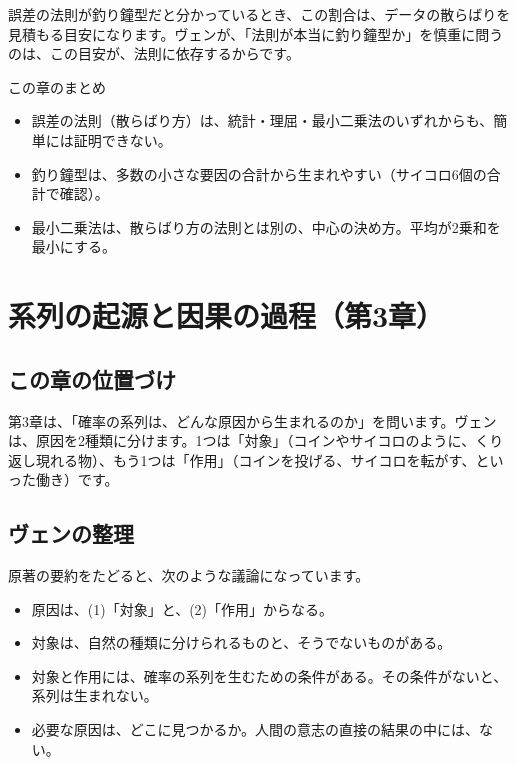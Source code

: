 \documentclass[a4paper,11pt,openany]{ltjsbook}
\begin{document}
誤差の法則が釣り鐘型だと分かっているとき、この割合は、データの散らばりを見積もる目安になります。ヴェンが、「法則が本当に釣り鐘型か」を慎重に問うのは、この目安が、法則に依存するからです。

\begin{pointbox}{この章のまとめ}
\begin{itemize}[leftmargin=*]
\item 誤差の法則（散らばり方）は、統計・理屈・最小二乗法のいずれからも、簡単には証明できない。
\item 釣り鐘型は、多数の小さな要因の合計から生まれやすい（サイコロ6個の合計で確認）。
\item 最小二乗法は、散らばり方の法則とは別の、中心の決め方。平均が2乗和を最小にする。
\end{itemize}
\end{pointbox}

\chapter{系列の起源と因果の過程（第3章）}

\section{この章の位置づけ}

第3章は、「確率の系列は、どんな原因から生まれるのか」を問います。ヴェンは、原因を2種類に分けます。1つは「対象」（コインやサイコロのように、くり返し現れる物）、もう1つは「作用」（コインを投げる、サイコロを転がす、といった働き）です。

\section{ヴェンの整理}

原著の要約をたどると、次のような議論になっています。

\begin{itemize}[leftmargin=*]
\item 原因は、(1)「対象」と、(2)「作用」からなる。
\item 対象は、自然の種類に分けられるものと、そうでないものがある。
\item 対象と作用には、確率の系列を生むための条件がある。その条件がないと、系列は生まれない。
\item 必要な原因は、どこに見つかるか。人間の意志の直接の結果の中には、ない。
\end{itemize}
\end{document}
